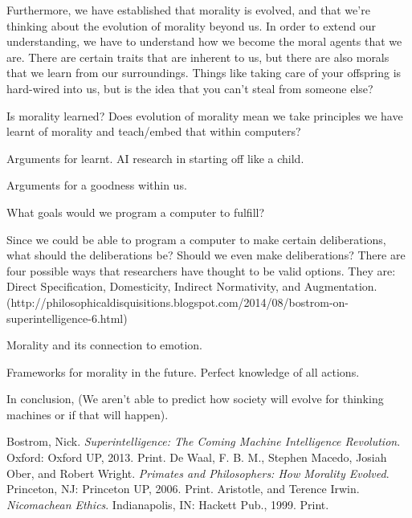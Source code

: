 \documentclass[11pt, oneside]{article}
\begin{document}
\par Furthermore, we have established that morality is evolved, and that we're thinking about the evolution of morality beyond us. In order to extend our understanding, we have to understand how we become the moral agents that we are. There are certain traits that are inherent to us, but there are also morals that we learn from our surroundings. Things like taking care of your offspring is hard-wired into us, but is the idea that you can't steal from someone else? 

 Is morality learned? Does evolution of morality mean we take principles we have learnt of morality and teach/embed that within computers? 

\par Arguments for learnt. AI research in starting off like a child.

\par Arguments for a goodness within us. 

\par What goals would we program a computer to fulfill? 

\par Since we could be able to program a computer to make certain deliberations, what should the deliberations be? Should we even make deliberations? There are four possible ways that researchers have thought to be valid options. They are: Direct Specification, Domesticity, Indirect Normativity, and Augmentation. (http://philosophicaldisquisitions.blogspot.com/2014/08/bostrom-on-superintelligence-6.html)

\par Morality and its connection to emotion.

\par Frameworks for morality in the future. Perfect knowledge of all actions. 

\par In conclusion, (We aren't able to predict how society will evolve for thinking machines or if that will happen).

\begin{thebibliography}{9}

  Bostrom, Nick. 
  \emph{Superintelligence: The Coming Machine Intelligence Revolution}.
  Oxford: Oxford UP, 2013. 
  Print.
  De Waal, F. B. M., Stephen Macedo, Josiah Ober, and Robert Wright.
  \emph{Primates and Philosophers: How Morality Evolved}.
  Princeton, NJ: Princeton UP, 2006.
  Print.
  Aristotle, and Terence Irwin.
  \emph{Nicomachean Ethics}.
  Indianapolis, IN: Hackett Pub., 1999.
  Print.
\end{thebibliography}
\end{document}
